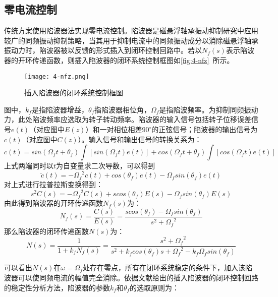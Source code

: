 \documentclass[
  lang=cn,
  degree=master,
  openany,oneside
]{nuaathesis}
\begin{document}
\subsection{零电流控制}

传统方案使用陷波器法实现零电流控制。陷波器是磁悬浮轴承振动抑制研究中应用较广的同频振动抑制策略，当其用于抑制电流中的同频振动成分以消除磁悬浮轴承振动力时，陷波器被以反馈的形式插入到闭环控制回路中。若以$N_f(s)$表示陷波器的开环传递函数，则插入陷波器的闭环系统控制框图如\autoref{fig:4-nfz}~所示。

\begin{figure}
	\texttt{[image: 4-nfz.png]}
	\caption{插入陷波器的闭环系统控制框图}
	\label{fig:4-nfz}
\end{figure}

图中，$k_f$是指陷波器增益，$\theta _f$指陷波器相位角，$\Omega _f$是指陷波频率。为抑制同频振动力，此处陷波频率应选取为转子转动频率。陷波器的输入信号包括转子位移误差信号$e(t)$（对应图中$E(z)$）和一对相位相差$90^{\circ}$的正弦信号；陷波器的输出信号为$c(t)$（对应图中$C(z)$）。输入信号和输出信号的转换关系为：
\begin{equation}
c(t) = sin({\Omega}_f t + \theta _f) \int [sin({\Omega}_f t)e(t)]+cos({\Omega}_f t + \theta _f) \int [cos({\Omega}_f t)e(t)]
\end{equation}
上式两端同时以$t$为自变量求二次导数，可以得到
\begin{equation}
\ddot{c}(t) = -{{\Omega}_f}^2c(t)+cos(\theta _f)\dot{e}(t)-{\Omega}_f sin(\theta _f)e(t)
\end{equation}
对上式进行拉普拉斯变换得到：
\begin{equation}
s^2C(s) = -{{\Omega}_f}^2C(s)+scos(\theta _f)E(s)-{\Omega}_f sin(\theta _f)E(s)
\end{equation}
由此得到陷波器的开环传递函数$N_f(s)$为：
\begin{equation}
N_f(s) = \frac{C(s)}{E(s)} = \frac{scos(\theta _f) - {\Omega}_f sin(\theta _f)}{s^2 + {{\Omega}_f}^2}
\end{equation}
那么陷波器的闭环传递函数$N(s)$为：
\begin{equation}
N(s) = \frac{1}{1+k_fN_f(s)}=\frac{s^2+{{\Omega}_f}^2}{s^2+k_fcos(\theta _f)s + {{\Omega}_f}^2-k_f{\Omega}_f sin(\theta _f)}
\end{equation}

可以看出$N(s)$在$\omega = \Omega _f$处存在零点，所有在闭环系统稳定的条件下，加入该陷波器可以使同频电流的幅值完全消除。依据文献\cite{何家希2018磁悬浮高速电机主动振动控制方法及实验研究}给出的插入陷波器的闭环控制回路的稳定性分析方法，陷波器的参数$k_f$和$\theta _f$的选取原则为：
\end{document}

